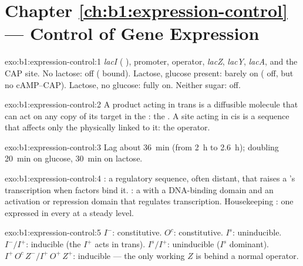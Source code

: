 \section*{Chapter \ref{ch:b1:expression-control} --- Control of Gene Expression}

\begin{solution}{exo:b1:expression-control:1}
\emph{lacI} ( ), promoter, operator, \emph{lacZ},
\emph{lacY}, \emph{lacA}, and the CAP site. No lactose: off (
bound). Lactose, glucose present: barely on ( off, but no
cAMP--CAP). Lactose, no glucose: fully on. Neither sugar: off.
\end{solution}

\begin{solution}{exo:b1:expression-control:2}
A product acting in trans is a diffusible molecule that can act on any
copy of its target in the : the . A site acting in cis is
a  sequence that affects only the  physically linked to it:
the operator.
\end{solution}

\begin{solution}{exo:b1:expression-control:3}
Lag about \qty{36}{min} (from \qty{2}{h} to \qty{2.6}{h}); doubling
\qty{20}{min} on glucose, \qty{30}{min} on lactose.
\end{solution}

\begin{solution}{exo:b1:expression-control:4}
: a regulatory sequence, often distant, that raises a 's
transcription when factors bind it. : a 
with a DNA-binding domain and an activation or repression domain that
regulates transcription. Housekeeping : one expressed in every
 at a steady level.
\end{solution}

\begin{solution}{exo:b1:expression-control:5}
$I^-$: constitutive. $O^c$: constitutive. $I^s$: uninducible.
$I^-/I^+$: inducible (the $I^+$  acts in trans). $I^s/I^+$:
uninducible ($I^s$ dominant). $I^+\,O^c\,Z^- / I^+\,O^+\,Z^+$: inducible
--- the only working $Z$ is behind a normal operator.
\end{solution}

